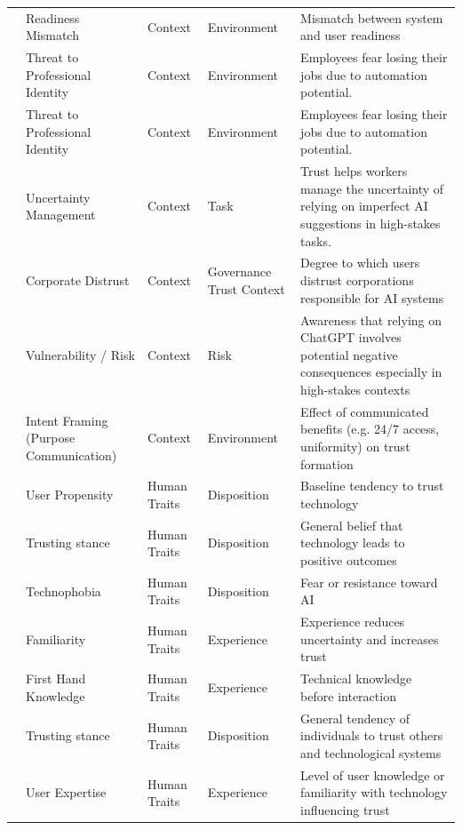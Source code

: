 \begin{longtable}{l l l l p{4cm}}
\cite{bach_systematic_literature_review} & Readiness Mismatch & Context & Environment & Mismatch between system and user readiness \\
\cite{banh2023generative} & Threat to Professional Identity & Context & Environment & Employees fear losing their jobs due to automation potential. \\
\cite{arlasan_artificial_intelligence} & Threat to Professional Identity & Context & Environment & Employees fear losing their jobs due to automation potential. \\
\cite{choudhury_asan_2020_trust_clinicians} & Uncertainty Management & Context & Task & Trust helps workers manage the uncertainty of relying on imperfect AI suggestions in high-stakes tasks. \\
\cite{schepman_general_attitude} & Corporate Distrust & Context & Governance Trust Context & Degree to which users distrust corporations responsible for AI systems \\
\cite{choudhury_chat_gpt} & Vulnerability / Risk & Context & Risk & Awareness that relying on ChatGPT involves potential negative consequences especially in high-stakes contexts \\
\cite{aoki_chatbot_experimental} & Intent Framing (Purpose Communication) & Context & Environment & Effect of communicated benefits (e.g. 24/7 access, uniformity) on trust formation \\
\cite{SangseokYou_CathyLiuYang_Xitong_2022} & User Propensity & Human Traits & Disposition & Baseline tendency to trust technology \\
\cite{tussyadiah_do_travelers_trust} & Trusting stance & Human Traits & Disposition & General belief that technology leads to positive outcomes \\
\cite{What_factors_contribute_to_the_acceptance_of_artificial_intelligence} & Technophobia & Human Traits & Disposition & Fear or resistance toward AI \\
\cite{chi_formative_scale} & Familiarity & Human Traits & Experience & Experience reduces uncertainty and increases trust \\
\cite{zhang_automated_vehicle_acceptance} & First Hand Knowledge & Human Traits & Experience & Technical knowledge before interaction \\
\cite{schepman_general_attitude} & Trusting stance & Human Traits & Disposition & General tendency of individuals to trust others and technological systems \\
\cite{schepman_general_attitude} & User Expertise & Human Traits & Experience & Level of user knowledge or familiarity with technology influencing trust \\

\end{longtable}
